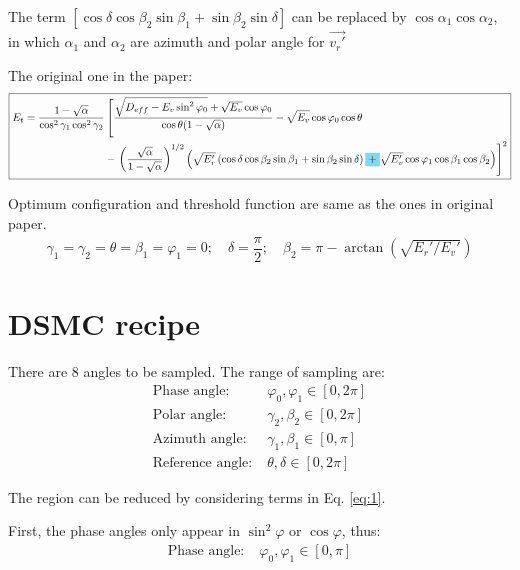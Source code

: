 \documentclass[11pt,letterpaper]{article}
\renewcommand{\phi}{\varphi}
\newcommand{\highlight}[1]{%
	\colorbox{cyan!50}{$\displaystyle#1$}}
\begin{document}
The term $\left[\cos \delta \cos\beta_2 \sin \beta _1  + \sin\beta_2\sin \delta\right]$ can be replaced by $ \cos \alpha_1 \cos \alpha_2 $, in which $ \alpha_1 $  and  $ \alpha_2 $ are azimuth and polar angle for $ \vec{v_r'} $ 


The original one in the paper:
\begin{equation}
\boxed{
	\begin{aligned}
	E_t = \dfrac{1 - \sqrt{\alpha}}{\cos^2 \gamma_1 \cos^2 \gamma_2}& \left[ \dfrac{\sqrt{D_{eff}- E_v \sin^2 \phi_0} + \sqrt{E_v} \cos \phi_0 }{\cos \theta (1 - \sqrt{\alpha})} - \sqrt{E_v} \cos\phi_0 \cos \theta \right.\\
	& -\left.   \left(\dfrac{\sqrt{\alpha}}{1-\sqrt{\alpha}}\right)^{1/2}\left( \sqrt{E_r'}\left( \cos \delta \cos\beta_2 \sin \beta _1  + \sin\beta_2\sin \delta \right) \highlight{+}  \sqrt{E_v'}  \cos \phi_1 \cos \beta _1 \cos\beta _2 \right) \right]^2
	\end{aligned}}
\end{equation}

Optimum configuration and threshold function are same as the ones in original paper.
\begin{equation}
\begin{gathered}
\gamma_1 = \gamma_2 = \theta = \beta_1 = \phi_1 =0; \quad \delta = \dfrac{\pi}{2}; \quad \beta_2 = \pi - \arctan(\sqrt{E_r'/E_v'})
\end{gathered}
\end{equation}

\section{DSMC recipe}

There are 8 angles to be sampled. The range of sampling are:
\begin{equation}
\begin{aligned}
\text{Phase angle}:&\; \phi_0, \phi_1\in [0,2\pi]  \\
\text{Polar angle}:&\; \gamma_2, \beta_2 \in [0,2\pi]  \\
\text{Azimuth angle}:&\; \gamma_1, \beta_1 \in [0,\pi]  \\
\text{Reference angle}:&\; \theta, \delta \in [0,2\pi] 
\end{aligned}
\end{equation}


The region can be reduced by considering terms in Eq. \ref{eq:1}. 

First, the phase angles only appear in $ \sin^2\phi $ or $ \cos \phi $, thus:
\begin{align}
\text{Phase angle}:&\; \phi_0, \phi_1\in [0,\pi]  
\end{align}
\end{document}
